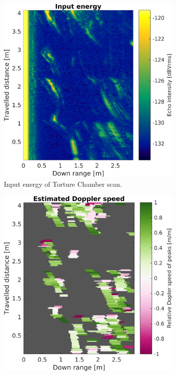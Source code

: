 \begin{figure}[htbp]
    \centering
    \begin{subfigure}[t]{.32\textwidth}
        \includegraphics[max width=\linewidth]{gfx/figures/t_input.png}
        \caption{Input energy of Torture Chamber scan.}
        \label{fig:pres3-i}
    \end{subfigure}%
    \hfill%
    \begin{subfigure}[t]{.32\textwidth}
        \includegraphics[max width=\linewidth]{gfx/figures/t_doppler.png}

\end{subfigure}
\end{figure}
